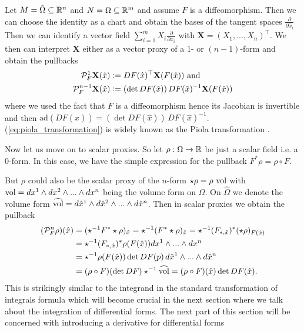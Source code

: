 \documentclass[../main.tex]{subfiles}
\begin{document}
Let $M = \hat{\Omega} \subseteq \mathbb{R}^n$ and $N = \Omega \subseteq \mathbb{R}^m$ and assume 
$F$ is a diffeomorphism. Then we can choose the identity as a chart and obtain 
the bases of the tangent spaces $\frac{\partial}{\partial \hat{x}_i}$
Then we 
can identify a vector field $\sum_{i=1}^m X_i \frac{\partial}{\partial x_i}$
with $\mathbf{X} = (X_1,...,X_n)^\top$. We then can interpret $\mathbf{X}$ 
either as a vector proxy of a $1$- or $(n-1)$-form and obtain the pullbacks
\begin{align}
    \mathcal{P}^1_F \mathbf{X}(\hat{x}) &\vcentcolon= DF(\hat{x})^\top \mathbf{X}(F(\hat{x})) \text{ and} \notag
    \\ \mathcal{P}^{n-1}_F \mathbf{X}(\hat{x}) &\vcentcolon= (\det DF(\hat{x}))\,
        DF(\hat{x})^{-1} \mathbf{X}(F(\hat{x}))\label{eq:piola_transformation}
\end{align}
where we used the fact that $F$ is a diffeomorphism hence its Jacobian 
is invertible and then $\text{ad}(DF(\hat{x})) = (\det DF(\hat{x}))\,
DF(\hat{x})^{-1}$.
(\ref{eq:piola_transformation}) is widely known as the Piola transformation \cite[Def.\,9.8]{ern_guermond}.

Now let us move on to scalar proxies. So let $\rho: \Omega \rightarrow \mathbb{R}$ be 
just a scalar field i.e. a $0$-form. In this case, we 
have the simple expression for the pullback $F^* \rho = \rho \circ F$. 

But $\rho$ could also be the scalar proxy of the $n$-form 
$\star \rho = \rho\, \operatorname{vol}$ with $\operatorname{vol} = dx^1 \wedge dx^2
\wedge ... \wedge dx^n$ being the volume form on $\Omega$. 
On $\hat{\Omega}$ we denote the volume form
$\widehat{\operatorname{vol}} = d\hat{x}^1 \wedge d\hat{x}^2 \wedge ... \wedge d\hat{x}^n$.
Then in scalar proxies we obtain the pullback
\begin{align*}
    (\mathcal{P}_F^n \rho )(\hat{x}) 
    &= (\star ^{-1}F^* \star \rho)_{\hat{x}}
    = \star ^{-1} (F^* \star \rho)_{\hat{x}}
    = \star ^{-1} (F_{*,\hat{x}})^* (\star \rho)_{F(\hat{x})}
    \\ &= \star ^{-1} (F_{*,\hat{x}})^* \rho(F(\hat{x})) dx^1 \wedge ... \wedge dx^n
    \\ &= \star ^{-1} \rho(F(\hat{x})) \det DF(p) \, d\hat{x}^1 \wedge ... \wedge d\hat{x}^n
    \\ &=  (\rho \circ F) (\det DF) \star^{-1}\widehat{\operatorname{vol}}
    = (\rho \circ F)(\hat{x}) \det DF(\hat{x}).
\end{align*}
This is strikingly similar to the integrand in the standard transformation 
of integrals formula which will become crucial in the next section
where we talk about the
integration of differential forms. The next part of this section will be 
concerned with introducing a derivative for differential forms
\end{document}
